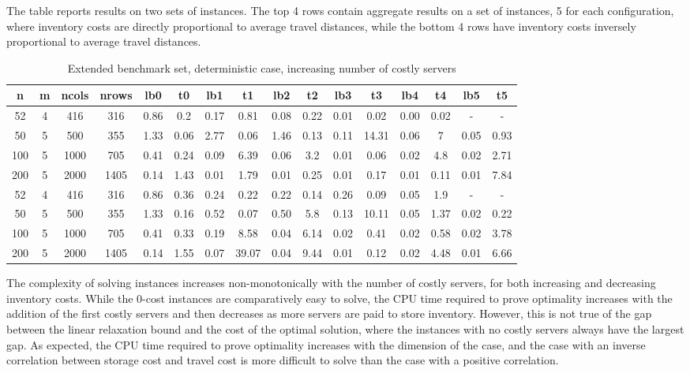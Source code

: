 \documentclass[ijoc,sglanonrev]{informs4}
\begin{document}
The table reports results on two sets of instances. The top 4 rows contain aggregate results on a set of instances, 5 for each configuration, where inventory costs are directly proportional to average travel distances, while the bottom 4 rows have inventory costs inversely proportional to average travel distances.

\begin{table}
\addtolength{\tabcolsep}{-3pt}
\footnotesize 
\centering
\renewcommand{\arraystretch}{1.2}
\begin{tabular}{cccc|cc|cc|cc|cc|cc|cc}
n & m & ncols & nrows & lb0 & t0 & lb1 & t1 & lb2 & t2 & lb3 & t3 & lb4 & t4 & lb5 & t5 \\
\hline
52 & 4  & 416 & 316 & 0.86 & 0.2 & 0.17 & 0.81 & 0.08 & 0.22 & 0.01 & 0.02 & 0.00 & 0.02 & - & - \\
50 & 5  & 500 & 355 & 1.33 & 0.06 & 2.77 & 0.06 & 1.46 & 0.13 & 0.11 & 14.31 & 0.06 & 7 & 0.05 & 0.93 \\
100 & 5 & 1000 & 705 & 0.41 & 0.24 & 0.09 & 6.39 & 0.06 & 3.2 & 0.01 & 0.06 & 0.02 & 4.8 & 0.02 & 2.71 \\
200 & 5 & 2000 & 1405 & 0.14 & 1.43 & 0.01 & 1.79 & 0.01 & 0.25 & 0.01 & 0.17 & 0.01 & 0.11 & 0.01 & 7.84 \\
\hline
52 & 4  & 416 & 316 & 0.86 & 0.36 & 0.24 & 0.22 & 0.22 & 0.14 & 0.26 & 0.09 & 0.05 & 1.9 & - & - \\
50 & 5  & 500 & 355 & 1.33 & 0.16 & 0.52 & 0.07 & 0.50 & 5.8 & 0.13 & 10.11 & 0.05 & 1.37 & 0.02 & 0.22 \\
100 & 5 & 1000 & 705 & 0.41 & 0.33 & 0.19 & 8.58 & 0.04 & 6.14 & 0.02 & 0.41 & 0.02 & 0.58 & 0.02 & 3.78 \\
200 & 5 & 2000 & 1405 & 0.14 & 1.55 & 0.07 & 39.07 & 0.04 & 9.44 & 0.01 & 0.12 & 0.02 & 4.48 & 0.01 & 6.66 \\
\hline
\end{tabular}
\caption{Extended benchmark set, deterministic case, increasing number of costly servers}
\label{table:extsetq}
\end{table}

The complexity of solving instances increases non-monotonically with the number of costly servers, for both increasing and decreasing inventory costs. While the 0-cost instances are comparatively easy to solve, the CPU time required to prove optimality increases with the addition of the first costly servers and then decreases as more servers are paid to store inventory. However, this is not true of the gap between the linear relaxation bound and the cost of the optimal solution, where the instances with no costly servers always have the largest gap.
As expected, the CPU time required to prove optimality increases with the dimension of the case, and the case with an inverse correlation between storage cost and travel cost is more difficult to solve than the case with a positive correlation.
\end{document}

